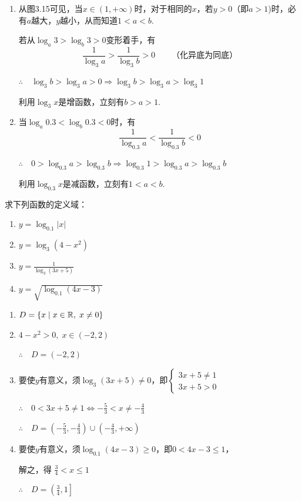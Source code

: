 \begin{solution}
\begin{enumerate}[(1)]
    \item 从图3.15可见，当$x\in (1,+\infty)$时，对于相同的$x$，若$y>0$（即$a>1$)时，必有$a$越大，$y$越小，从而知道$1<a<b$.
    
    若从$\log_a 3>\log_b 3>0$变形着手，有
\[\frac{1}{\log_3 a}>\frac{1}{\log_3 b}>0 \qquad \text{（化异底为同底）}\]

$\therefore\quad \log_3 b>\log_3 a>0\Longrightarrow \log_3 b>\log_3 a>\log_3 1$

利用$\log_3 x$是增函数，立刻有$b>a>1$.
\item 当$\log_a 0.3<\log_b 0.3<0$时，有
\[\frac{1}{\log_{0.3} a}<\frac{1}{\log_{0.3} b}<0\]

$\therefore\quad 0>\log_{0.3} a>\log_{0.3} b \Longrightarrow \log_{0.3} 1>\log_{0.3} a>\log_{0.3} b$

利用$\log_{0.3} x$是减函数，立刻有$1<a<b$.
\end{enumerate}
\end{solution}

\begin{example}
求下列函数的定义域：
\begin{multicols}{2}
\begin{enumerate}[(1)]
    \item $y=\log_{0.1}|x|$
    \item $y=\log_3 (4-x^2)$
    \item $y=\frac{1}{\log_3(3x+5)}$
    \item $y=\sqrt{\log_{0.1}(4x-3)}$
\end{enumerate}
\end{multicols}
\end{example}

\begin{solution}
\begin{enumerate}[(1)]
    \item $D=\{x\mid x\in\mathbb{R},\; x\ne 0\}$
    \item $4-x^2>0,\; x\in(-2,2)$
    
$\therefore\quad D=(-2,2)$

\item 要使$y$有意义，须$\log_3(3x+5)\ne 0$，即$\begin{cases}
    3x+5\ne 1\\ 3x+5>0
\end{cases}$

$\therefore\quad 0<3x+5\ne 1\Longleftrightarrow -\frac{5}{3}<x\ne -\frac{4}{3}$

$\therefore\quad D=\left(-\frac{5}{3},-\frac{4}{3}\right)\cup\left(-\frac{4}{3},+\infty\right)$

\item 要使$y$有意义，须$\log_{0.1}(4x-3)\ge 0$，即$0<4x-3\le 1$，

解之，得
$\frac{3}{4}<x\le 1$

$\therefore\quad D=\left(\frac{3}{4}, 1\right]$
\end{enumerate}
\end{solution}

